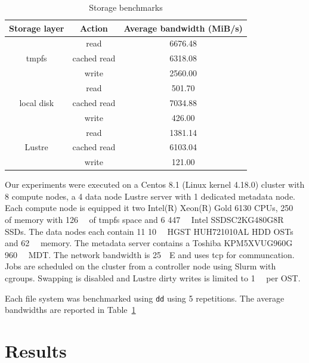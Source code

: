       \begin{table}
      \centering
      \begin{tabular}{@{}|c|c|c|@{}}
       \hline
       Storage layer & Action & Average bandwidth (MiB/s) \\
              \hline
       \multirow{3}{*}{tmpfs} & read & 6676.48 \\
       & cached read & 6318.08  \\
       & write & 2560.00 \\
       \hline
       \multirow{3}{*}{local disk} & read & 501.70  \\
       & cached read & 7034.88 \\
       & write & 426.00 \\
       \hline
       \multirow{3}{*}{Lustre} & read & 1381.14 \\
       & cached read & 6103.04  \\
       & write & 121.00  \\

       \hline

      \end{tabular}
      \caption{Storage benchmarks}
      \label{table:sea-comp:fs}
      \end{table}
            Our experiments were executed on a Centos 8.1 (Linux kernel 4.18.0)
      cluster with 8 compute nodes, a 4 data node Lustre server with 1 dedicated
      metadata node. Each compute node is equipped it two Intel(R) Xeon(R) Gold
      6130 CPUs, \SI{250}{\gibi\byte} of memory with \SI{126}{\gibi\byte} of
      tmpfs space and 6 \SI{447}{\gibi\byte} Intel SSDSC2KG480G8R SSDs. The data
      nodes each contain 11 \SI{10}{\tera\byte} HGST HUH721010AL HDD OSTs and
      \SI{62}{\gibi\byte} memory. The metadata server contains a Toshiba
      KPM5XVUG960G \SI{960}{\giga\byte} MDT. The network bandwidth is
      \SI{25}{\giga\bit}E and uses tcp for communcation. Jobs are scheduled on
      the cluster from a controller node using Slurm with cgroups. Swapping is
      disabled and Lustre dirty writes is limited to \SI{1}{\giga\byte} per OST.

      Each file system was benchmarked using \texttt{dd} using 5 repetitions.
      The average bandwidths are reported in Table~\ref{table:sea-comp:fs}


\section{Results}

